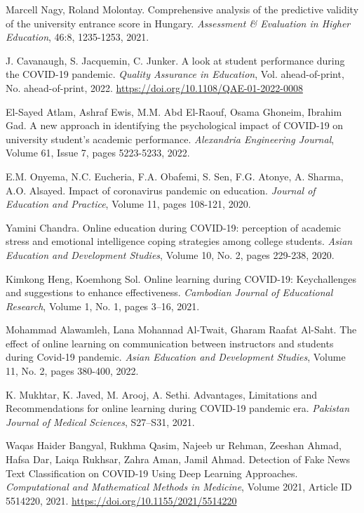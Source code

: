 \documentclass[12pt]{article}
\begin{document}
\begin{thebibliography}{9}
Marcell Nagy, Roland Molontay. Comprehensive analysis of the predictive validity of the university entrance score in Hungary. \textit{Assessment \& Evaluation in Higher Education}, 46:8, 1235-1253, 2021.

J. Cavanaugh, S. Jacquemin, C. Junker. A look at student performance during the COVID-19 pandemic. \textit{Quality Assurance in Education}, Vol. ahead-of-print,  No. ahead-of-print, 2022. \url{https://doi.org/10.1108/QAE-01-2022-0008}


El-Sayed Atlam, Ashraf Ewis, M.M. Abd El-Raouf, Osama Ghoneim, Ibrahim Gad. A new approach in identifying the psychological impact of COVID-19 on university student’s academic performance. \textit{Alexandria Engineering Journal}, Volume 61, Issue 7, pages 5223-5233, 2022.

E.M. Onyema, N.C. Eucheria, F.A. Obafemi, S. Sen, F.G. Atonye, A. Sharma, A.O. Alsayed. Impact of coronavirus pandemic on education. \textit{Journal of Education and Practice}, Volume 11, pages 108-121, 2020.

Yamini Chandra. Online education during COVID-19: perception of academic stress and emotional intelligence coping strategies among college students. \textit{Asian Education and Development Studies}, Volume 10, No. 2, pages 229-238, 2020.

Kimkong Heng, Koemhong Sol. Online learning during COVID-19: Keychallenges and suggestions to enhance effectiveness. \textit{Cambodian Journal of Educational Research}, Volume 1, No. 1, pages 3–16, 2021.

Mohammad Alawamleh, Lana Mohannad Al-Twait, Gharam Raafat Al-Saht. The effect of online learning on communication between instructors and students during Covid-19 pandemic. \textit{Asian Education and Development Studies}, Volume 11, No. 2, pages 380-400, 2022.

K. Mukhtar, K. Javed, M. Arooj, A. Sethi. Advantages, Limitations and Recommendations for online learning during COVID-19 pandemic era. \textit{Pakistan Journal of Medical Sciences}, S27–S31, 2021. 

 Waqas Haider Bangyal, Rukhma Qasim, Najeeb ur Rehman, Zeeshan Ahmad, Hafsa Dar, Laiqa Rukhsar, Zahra Aman, Jamil Ahmad. Detection of Fake News Text Classification on COVID-19 Using Deep Learning Approaches. \textit{Computational and Mathematical Methods in Medicine}, Volume 2021, Article ID 5514220, 2021. \href{https://doi.org/10.1155/2021/5514220}{https://doi.org/10.1155/2021/5514220}


\end{thebibliography}
\end{document}

